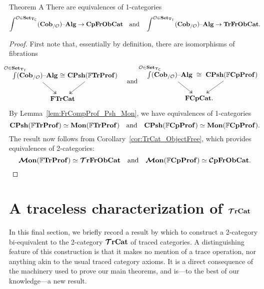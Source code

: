\documentclass[11pt,oneside,article]{memoir}
\begin{document}
\begin{named}{Theorem A}
    \label{thm:TheoremA}
  There are equivalences of 1-categories
  \begin{equation*}
    \int^{\mathcal{O}\in\mathbf{Set}_{\mathbf{T}_{\mathsf{C}}}}(\mathbf{Cob}_{/\mathcal{O}}){\text \textendash}\mathbf{Alg} \to \mathbf{CpFrObCat}
    \quad\text{and}\quad
    \int^{\mathcal{O}\in\mathbf{Set}_{\mathbf{T}_{\mathsf{T}}}}(\mathbf{Cob}_{/\mathcal{O}}){\text \textendash}\mathbf{Alg} \to \mathbf{TrFrObCat}.
  \end{equation*}
\end{named}
\begin{proof}
  First note that, essentially by definition, there are isomorphisms of fibrations
  \begin{equation*}
    \begin{tikzcd}[column sep=-2em]
      \int\limits^{\mathclap{\LabSet\in\Set_{\TT}}}(\LCob{\LabSet})\alg
          \ar[rr,phantom,"\iso"] \ar[dr,two heads]
        && \CPsh(\dFrTrProf) \ar[dl,two heads] \\
      & \FrTrCat &
    \end{tikzcd}
    \quad\text{and}\quad
    \begin{tikzcd}[column sep=-2em]
      \int\limits^{\mathclap{\LabSet\in\Set_{\TC}}}(\LCob{\LabSet})\alg
          \ar[rr,phantom,"\iso"] \ar[dr,two heads]
        && \CPsh(\dFrCompProf) \ar[dl,two heads] \\
      & \FrCompCat. &
    \end{tikzcd}
  \end{equation*}
  By Lemma~\ref{lem:FrCompProf_Psh_Mon}, we have equivalences of 1-categories
  \begin{equation}
    \mathbf{CPsh}(\mathbb{F}\mathbf{TrProf})\simeq\mathbf{Mon}(\mathbb{F}\mathbf{TrProf})
    \quad\text{and}\quad
    \mathbf{CPsh}(\mathbb{F}\mathbf{CpProf})\simeq\mathbf{Mon}(\mathbb{F}\mathbf{CpProf}).
  \end{equation}
  The result now follows from Corollary~\ref{cor:TrCat_ObjectFree}, which provides equivalences of
  2-categories:
  \[
    \bm{\mathcal{M}}\mathbf{on}(\mathbb{F}\mathbf{TrProf})\simeq\bm{\mathcal{T}}\mathbf{rFrObCat}
    \quad\text{and}\quad
    \bm{\mathcal{M}}\mathbf{on}(\mathbb{F}\mathbf{CpProf})\simeq\bm{\mathcal{C}}\mathbf{pFrObCat}.
  \]
\end{proof}

\section{A traceless characterization of \texorpdfstring{$\bm{\mathcal{T}}\mathbf{rCat}$}{TrCat}}
  \label{sec:characterization_of_traced}

In this final section, we briefly record a result by which to construct a 2-category
bi-equivalent to the 2-category $\bm{\mathcal{T}}\mathbf{rCat}$ of traced categories. A distinguishing feature of this construction is that it makes no mention of a trace
operation, nor anything akin to the usual traced category axioms. It is a direct consequence of the machinery used to
prove our main theorems, and is---to the best of our knowledge---a new result.
\end{document}
